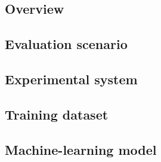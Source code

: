 \subsection{Overview}
\label{sec:overview}


\subsection{Evaluation scenario}
\label{sec:scenario}


\subsection{Experimental system}
\label{sec:experiment-system}


\subsection{Training dataset}
\label{sec:train-dataset}


\subsection{Machine-learning model}
\label{sec:machine-learning-model}

